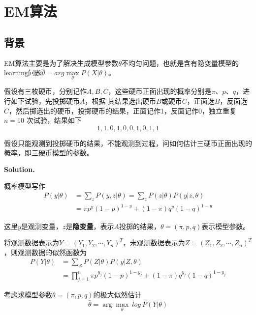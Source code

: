 \chapter{EM算法}

\section{背景}

EM算法主要是为了解决生成模型参数$\theta$不均匀问题，也就是含有隐变量模型的learning问题$\hat{\theta}=arg\max\limits_{\theta}P(X|\theta)$。

\begin{example}
    假设有三枚硬币，分别记作$A,B,C$，这些硬币正面出现的概率分别是$\pi$、$p$、$q$，进行如下试验，先投掷硬币$A$，根据
    其结果选出硬币$B$或硬币$C$，正面选$B$，反面选$C$，然后掷选出的硬币，投掷硬币的结果，正面记作1，反面记作0，独立重复$n=10$
    次试验，结果如下
    \begin{equation}
        1,1,0,1,0,0,1,0,1,1
    \end{equation}

    假设只能观测到投掷硬币的结果，不能观测到过程，问如何估计三硬币正面出现的概率，即三硬币模型的参数。
\end{example}

\textbf{Solution. }

概率模型写作
\begin{equation}
    \begin{aligned}
         P(y|\theta)&=\sum_{z}P(y,z|\theta)=\sum_{z}P(z|\theta)P(y|z,\theta)\\
        &=\pi p^{y}(1-p)^{1-y}+(1-\pi)q^{y}(1-q)^{1-y}
    \end{aligned}
\end{equation}

这里$y$是观测变量，$z$是\textbf{隐变量}，表示$A$投掷的结果，$\theta=(\pi,p,q)$表示模型参数。

将观测数据表示为$Y=(Y_1,Y_2,\cdots,Y_n)^T$，未观测数据表示为$Z=(Z_1,Z_2,\cdots,Z_n)^T$，则观测数据的似然函数为
\begin{equation}
    \begin{aligned}
        P(Y|\theta)&=\sum_{Z}P(Z|\theta)P(y|Z,\theta)\\
       &=\prod_{j=1}^{n}\pi p^{y_j}(1-p)^{1-y_j}+(1-\pi)q^{y_j}(1-q)^{1-y_j}
   \end{aligned}
\end{equation}

考虑求模型参数$\theta=(\pi,p,q)$的极大似然估计
\begin{equation}
    \hat{\theta}=\arg \max\limits_{\theta}\ log\ P(Y|\theta)
\end{equation}

